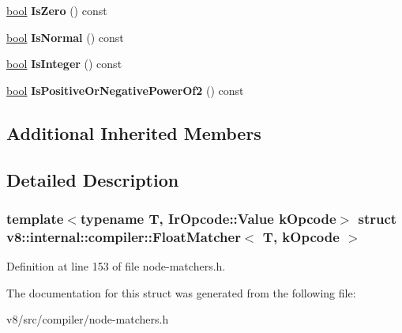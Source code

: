 \begin{DoxyCompactItemize}
\mbox{\hyperlink{classbool}{bool}} {\bfseries Is\+Zero} () const
\item 
\mbox{\label{structv8_1_1internal_1_1compiler_1_1FloatMatcher_a103d831bf1bdcfaff2137bbccc97a87d}} 
\mbox{\hyperlink{classbool}{bool}} {\bfseries Is\+Normal} () const
\item 
\mbox{\label{structv8_1_1internal_1_1compiler_1_1FloatMatcher_a4263e48ab701b128b491aef55c7d6f68}} 
\mbox{\hyperlink{classbool}{bool}} {\bfseries Is\+Integer} () const
\item 
\mbox{\label{structv8_1_1internal_1_1compiler_1_1FloatMatcher_aa4637894e3ef35556e950193d197b605}} 
\mbox{\hyperlink{classbool}{bool}} {\bfseries Is\+Positive\+Or\+Negative\+Power\+Of2} () const
\end{DoxyCompactItemize}
\subsection*{Additional Inherited Members}


\subsection{Detailed Description}
\subsubsection*{template$<$typename T, Ir\+Opcode\+::\+Value k\+Opcode$>$\newline
struct v8\+::internal\+::compiler\+::\+Float\+Matcher$<$ T, k\+Opcode $>$}



Definition at line 153 of file node-\/matchers.\+h.



The documentation for this struct was generated from the following file\+:\begin{DoxyCompactItemize}
\item 
v8/src/compiler/node-\/matchers.\+h\end{DoxyCompactItemize}
